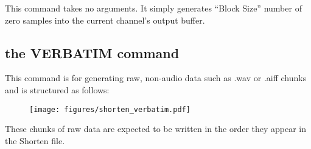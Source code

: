 This command takes no arguments.
It simply generates ``Block Size'' number of zero samples
into the current channel's output buffer.

\subsection{the VERBATIM command}

This command is for generating raw, non-audio data such
as .wav or .aiff chunks and is structured as follows:
\begin{figure}[h]
\texttt{[image: figures/shorten\_verbatim.pdf]}
\end{figure}
\par
\noindent
These chunks of raw data are expected to be written in the order
they appear in the Shorten file.

